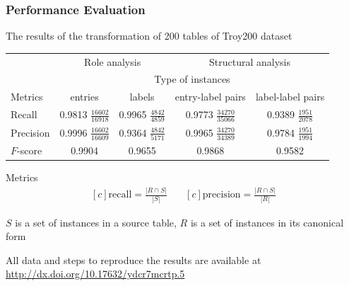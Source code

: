 \documentclass[10pt]{beamer}
\begin{document}



\begin{frame}
\frametitle{Performance Evaluation}
\small{The results of the transformation of 200 tables of Troy200 dataset}
\footnotesize{
\begin{table}
		\centering
		    \bgroup
        \def\arraystretch{1.5}
				\begin{tabular}{|l|c|c|c|c|}
						\hline
														& \multicolumn{2}{|c|}{Role analysis} & \multicolumn{2}{|c|}{Structural analysis} \\
														\cline{2-5}
														& \multicolumn{4}{|c|}{Type of instances} \\
														\cline{2-5}
			            Metrics   & entries                      & labels                     & entry-label pairs            & label-label pairs  \\
			      \hline
			            Recall    & 0.9813 $\frac{16602}{16918}$ & 0.9965 $\frac{4842}{4859}$ & 0.9773 $\frac{34270}{35066}$ & 0.9389 $\frac{1951}{2078}$ \\
			            Precision & 0.9996 $\frac{16602}{16609}$ & 0.9364 $\frac{4842}{5171}$ & 0.9965 $\frac{34270}{34389}$ & 0.9784 $\frac{1951}{1994}$ \\
									$F$-score & 0.9904                       & 0.9655                     & 0.9868                       & 0.9582                     \\
			      \hline
		    \end{tabular}
				\egroup
\end{table}
}
\begin{block}{\small Metrics}
\footnotesize{
\begin{equation*}
\begin{aligned}[c]
\text{recall} = \frac{\left|R \cap S\right|}{\left|S\right|}
\end{aligned}
\quad
\begin{aligned}[c]
\text{precision} = \frac{\left|R \cap S\right|}{\left|R\right|}
\end{aligned}
\end{equation*}
}
\scriptsize{\centerline{$S$ is a set of instances in a source table, $R$ is a set of instances in its canonical form}}
\end{block}
\tiny All data and steps to reproduce the results are available at \url{http://dx.doi.org/10.17632/ydcr7mcrtp.5}
\end{frame}
\end{document}
